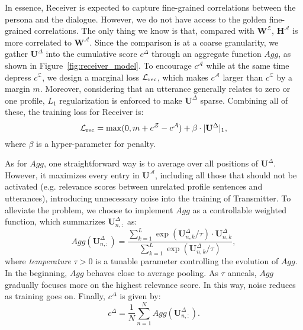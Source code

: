\documentclass[11pt,a4paper]{article}
\begin{document}
In essence, Receiver is expected to capture fine-grained correlations between the persona and the dialogue. However, we do not have access to the golden fine-grained correlations. The only thing we know is that, compared with $\mathbf{W}^{\mathcal{Z}}$, $\mathbf{H}^{\mathcal{A}}$ is more correlated to $\mathbf{W}^{\mathcal{A}}$. Since the comparison is at a coarse granularity, we gather $\mathbf{U}^{\Delta}$ into the cumulative score $c^{\Delta}$ through an aggregate function $Agg$, as shown in Figure~\ref{fig:receiver_model}. To encourage $c^{\mathcal{A}}$ while at the same time depress $c^{\mathcal{Z}}$, we design a marginal loss $\mathcal{L}_{\rm{rec}}$, which makes $c^{\mathcal{A}}$ larger than $c^{\mathcal{Z}}$ by a margin $m$. Moreover, considering that an utterance generally relates to zero or one profile, $L_1$ regularization is enforced to make $\mathbf{U}^{\Delta}$ sparse. Combining all of these, the training loss for Receiver is:
\begin{equation}
    \mathcal{L}_{\rm{rec}} = \max(0, m + c^{\mathcal{Z}} - c^{\mathcal{A}}) + \beta \cdot |\mathbf{U}^{\Delta}|_{1},
\end{equation}
where $\beta$ is a hyper-parameter for penalty.

As for $Agg$, one straightforward way is to average over all positions of $\mathbf{U}^{\Delta}$. However, it maximizes every entry in $\mathbf{U}^{\mathcal{A}}$, including all those that should not be activated (e.g. relevance scores between unrelated profile sentences and utterances), introducing unnecessary noise into the training of Transmitter. To alleviate the problem, we choose to implement $Agg$ as a controllable weighted function, which summarizes $\mathbf{U}^{\Delta}_{n,:}$ as:
\begin{equation}
    Agg(\mathbf{U}^{\Delta}_{n,:}) = \frac{\sum\nolimits_{k=1}^{L}\exp(\mathbf{U}^{\Delta}_{n,k}/ \!\tau) \cdot \mathbf{U}^{\Delta}_{n,k}}{\sum_{k=1}^{L}\exp(\mathbf{U}^{\Delta}_{n,k}/ \!\tau)},
\end{equation}
where \emph{temperature} $\tau > 0$ is a tunable parameter \cite{hinton2015distilling} controlling the evolution of $Agg$. In the beginning, $Agg$ behaves close to average pooling. As $\tau$ anneals, $Agg$ gradually focuses more on the highest relevance score. In this way, noise reduces as training goes on. 
Finally, $c^{\Delta}$ is given by:
\begin{equation}
c^{\Delta} = \frac{1}{N}\sum\limits_{n=1}^{N}Agg(\mathbf{U}^{\Delta}_{n,:}).
\end{equation}
\end{document}
